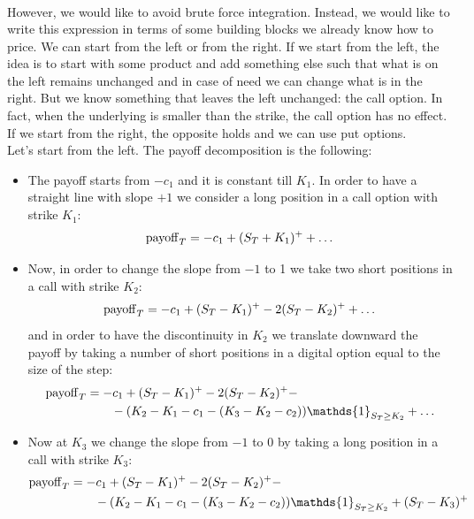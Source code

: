 \begin{example}{}{}{}
\begin{align}
    \end{align}
    However, we would like to avoid brute force integration. Instead, we would like to write this expression in terms of some building blocks we already know how to price. We can start from the left or from the right. If we start from the left, the idea is to start with some product and add something else such that what is on the left remains unchanged and in case of need we can change what is in the right. But we know something that leaves the left unchanged: the call option. In fact, when the underlying is smaller than the strike, the call option has no effect. If we start from the right, the opposite holds and we can use put options.\\
    Let's start from the left. The payoff decomposition is the following:
    \begin{itemize}
        \item The payoff starts from $-c_1$ and it is constant till $K_1$. In order to have a straight line with slope $+1$ we consider a long position in a call option with strike $K_1$:
        \begin{equation*}
            \operatorname{payoff}_T = -c_1 + (S_T+K_1)^+ +\dots
        \end{equation*}
        \item Now, in order to change the slope from $-1$ to 1 we take two short positions in a call with strike $K_2$:
        \begin{equation*}
            \operatorname{payoff}_T = -c_1 + (S_T-K_1)^+ - 2(S_T-K_2)^+ + \dots
        \end{equation*}
        and in order to have the discontinuity in $K_2$ we translate downward the payoff by taking a number of short positions in a digital option equal to the size of the step:
        \begin{align*}
            \pay_T &= -c_1 + (S_T-K_1)^+ - 2(S_T-K_2)^+ - \\ 
            &\qquad 
            -(K_2-K_1-c_1-(K_3-K_2-c_2))\mathds{1}_{S_T\ge K_2} + \dots
        \end{align*}
        \item Now at $K_3$ we change the slope from $-1$ to 0 by taking a long position in a call with strike $K_3$:
        \begin{align}
            \notag \pay_T &= -c_1 + (S_T-K_1)^+ - 2(S_T-K_2)^+ - \\ 
            &\qquad 
            -(K_2-K_1-c_1-(K_3-K_2-c_2))\mathds{1}_{S_T\ge K_2} + (S_T-K_3)^+
        \end{align}

\end{itemize}
\end{example}

